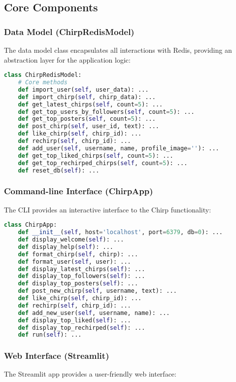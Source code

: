 \documentclass[a4paper,11pt]{article}
\begin{document}
\subsection{Core Components}

\subsubsection{Data Model (ChirpRedisModel)}
The data model class encapsulates all interactions with Redis, providing an abstraction layer for the application logic:

\begin{lstlisting}[language=Python, caption=Key methods in the ChirpRedisModel class]
class ChirpRedisModel:
    # Core methods
    def import_user(self, user_data): ...
    def import_chirp(self, chirp_data): ...
    def get_latest_chirps(self, count=5): ...
    def get_top_users_by_followers(self, count=5): ...
    def get_top_posters(self, count=5): ...
    def post_chirp(self, user_id, text): ...
    def like_chirp(self, chirp_id): ...
    def rechirp(self, chirp_id): ...
    def add_user(self, username, name, profile_image=''): ...
    def get_top_liked_chirps(self, count=5): ...
    def get_top_rechirped_chirps(self, count=5): ...
    def reset_db(self): ...
\end{lstlisting}

\subsubsection{Command-line Interface (ChirpApp)}
The CLI provides an interactive interface to the Chirp functionality:

\begin{lstlisting}[language=Python, caption=ChirpApp class structure]
class ChirpApp:
    def __init__(self, host='localhost', port=6379, db=0): ...
    def display_welcome(self): ...
    def display_help(self): ...
    def format_chirp(self, chirp): ...
    def format_user(self, user): ...
    def display_latest_chirps(self): ...
    def display_top_followers(self): ...
    def display_top_posters(self): ...
    def post_new_chirp(self, username, text): ...
    def like_chirp(self, chirp_id): ...
    def rechirp(self, chirp_id): ...
    def add_new_user(self, username, name): ...
    def display_top_liked(self): ...
    def display_top_rechirped(self): ...
    def run(self): ...
\end{lstlisting}

\subsubsection{Web Interface (Streamlit)}
The Streamlit app provides a user-friendly web interface:
\end{document}
